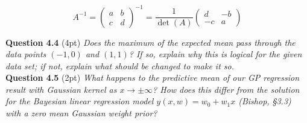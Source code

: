 \documentclass[a4paper]{article}
\begin{document}
\[
A^{-1} = 
\begin{pmatrix}
a & b\\
c & d
\end{pmatrix}^{-1}
=\frac{1}{\det (A)}
\begin{pmatrix}
d & -b\\
-c & a
\end{pmatrix}
\]


\textbf{Question 4.4} (4pt) \textit{Does the maximum of the expected mean pass through the data points $(-1, 0)$ and $(1,1)$? If so, explain why this is logical for the given data set; if not, explain what should be changed to make it so.}\\

\textbf{Question 4.5} (2pt) \textit{What happens to the predictive mean of our GP regression result with Gaussian kernel as $x \to \pm \infty$? How does this differ from the solution for the Bayesian linear regression model $y(x, w) = w_0 + w_1x$ (Bishop, §3.3) with a zero mean Gaussian weight prior?}\\
\end{document}
